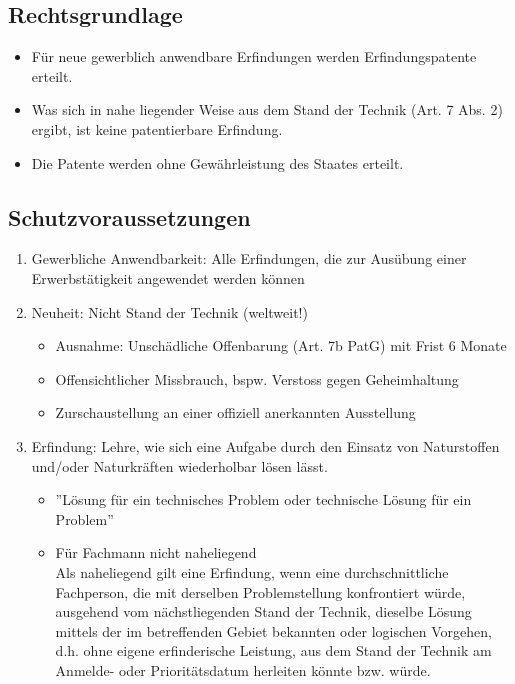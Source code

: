 \subsection{Rechtsgrundlage}
\label{sec:Patentrecht-Rechtsgrundlage}

\begin{itemize}
\tightlist
\item Für neue gewerblich anwendbare Erfindungen werden Erfindungspatente
erteilt.
\item Was sich in nahe liegender Weise aus dem Stand der Technik (Art. 7
Abs. 2) ergibt, ist keine patentierbare Erfindung.
\item Die Patente werden ohne Gewährleistung des Staates erteilt.
\end{itemize}


\subsection{Schutzvoraussetzungen}

\begin{enumerate}
	\tightlist
	\item  Gewerbliche Anwendbarkeit: Alle Erfindungen, die zur Ausübung einer
	Erwerbstätigkeit angewendet werden können
	\item Neuheit: Nicht Stand der Technik (weltweit!)
	\begin{itemize}
		\tightlist
		\item Ausnahme: Unschädliche Offenbarung (Art. 7b PatG) mit Frist 6 Monate
		\item Offensichtlicher Missbrauch, bspw. Verstoss gegen Geheimhaltung
		\item Zurschaustellung an einer offiziell anerkannten Ausstellung
	\end{itemize}
	\item Erfindung: Lehre, wie sich eine Aufgabe durch den Einsatz von
	Naturstoffen und/oder Naturkräften wiederholbar lösen lässt.
	\begin{itemize}
		\tightlist
		\item ''Lösung für ein technisches Problem oder technische Lösung für ein
		Problem''
		\item Für Fachmann nicht naheliegend\\
		Als naheliegend gilt eine Erfindung, wenn eine durchschnittliche
		Fachperson, die mit derselben Problemstellung konfrontiert würde,
		ausgehend vom nächstliegenden Stand der Technik, dieselbe Lösung
		mittels der im betreffenden Gebiet bekannten oder logischen
		Vorgehen, d.h. ohne eigene erfinderische Leistung, aus dem Stand der
		Technik am Anmelde- oder Prioritätsdatum herleiten könnte bzw.
		würde.
	\end{itemize}
\end{enumerate}


